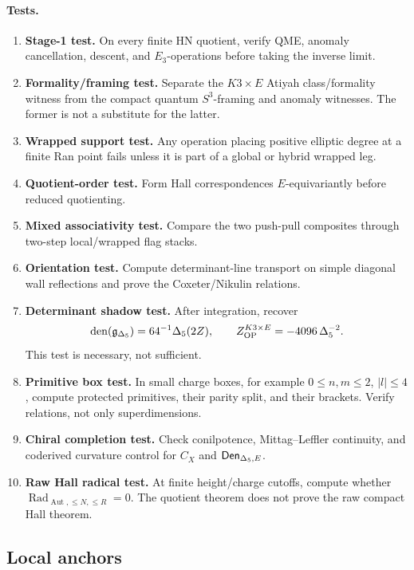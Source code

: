 \paragraph{Tests.}
\begin{enumerate}
\item \textbf{Stage-1 test.}  On every finite HN quotient, verify QME,
anomaly cancellation, descent, and \(E_3\)-operations before taking the
inverse limit.
\item \textbf{Formality/framing test.}  Separate the \(K3\times E\) Atiyah
class/formality witness from the compact quantum \(S^3\)-framing and
anomaly witnesses.  The former is not a substitute for the latter.
\item \textbf{Wrapped support test.}  Any operation placing positive
elliptic degree at a finite Ran point fails unless it is part of a
global or hybrid wrapped leg.
\item \textbf{Quotient-order test.}  Form Hall correspondences
\(E\)-equivariantly before reduced quotienting.
\item \textbf{Mixed associativity test.}  Compare the two push-pull
composites through two-step local/wrapped flag stacks.
\item \textbf{Orientation test.}  Compute determinant-line transport on
simple diagonal wall reflections and prove the Coxeter/Nikulin relations.
\item \textbf{Determinant shadow test.}  After integration, recover
\[
        \operatorname{den}(\mathfrak g_{\Delta_5})=64^{-1}\Delta_5(2Z),
        \qquad
        Z^{K3\times E}_{\operatorname{OP}}
        =-4096\,\Delta_5^{-2}.
\]
This test is necessary, not sufficient.
\item \textbf{Primitive box test.}  In small charge boxes, for example
\(0\le n,m\le 2\), \(|l|\le 4\), compute protected primitives, their
parity split, and their brackets.  Verify relations, not only
superdimensions.
\item \textbf{Chiral completion test.}  Check conilpotence, Mittag--Leffler
continuity, and coderived curvature control for \(C_X\) and \(\mathsf{Den}_{\Delta_5,E}\).
\item \textbf{Raw Hall radical test.}  At finite height/charge cutoffs,
compute whether \(\operatorname{Rad}_{\operatorname{Aut},\le N,\le R}=0\).
The quotient theorem does not prove the raw compact Hall theorem.
\end{enumerate}

\subsection{Local anchors}

